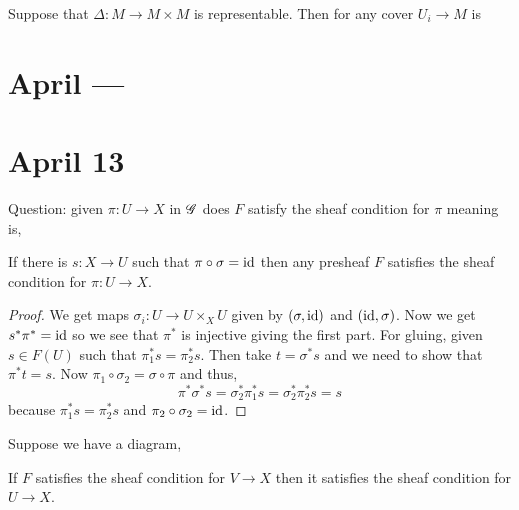 \documentclass[12pt]{article}
\begin{document}
\begin{rmk}
Suppose that $\Delta : M \to M \times M$ is representable. Then for any cover $U_i \to M$ is 
\end{rmk}

\section{April ---}

\section{April 13}

Question: given $\pi : U \to X$ in $\mathscr{G}$ does $F$ satisfy the sheaf condition for $\pi$ meaning is,
\begin{center}
\end{center}

\begin{theorem}
If there is $s : X \to U$ such that $\pi \circ \sigma = \mathrm{id}$ then any presheaf $F$ satisfies the sheaf condition for $\pi : U \to X$. 
\end{theorem}

\begin{proof}
We get maps $\sigma_i : U \to U \times_X U$ given by $(\sigma, \mathrm{id})$ and $(\mathrm{id}, \sigma)$. Now we get $s^* \pi^* = \mathrm{id}$ so we see that $\pi^*$ is injective giving the first part. For gluing, given $s \in F(U)$ such that $\pi_1^* s = \pi_2^* s$. Then take $t = \sigma^* s$ and we need to show that $\pi^* t = s$.  Now $\pi_1 \circ \sigma_2 = \sigma \circ \pi$ and thus,
\[ \pi^* \sigma^* s = \sigma_2^* \pi_1^* s = \sigma_2^* \pi_2^* s = s \]
because $\pi_1^* s = \pi_2^* s$ and $\pi_2 \circ \sigma_2 = \mathrm{id}$.
\end{proof}

\begin{cor}
Suppose we have a diagram,
\begin{center}
\end{center}
If $F$ satisfies the sheaf condition for $V \to X$ then it satisfies the sheaf condition for $U \to X$. 
\end{cor}
\end{document}
